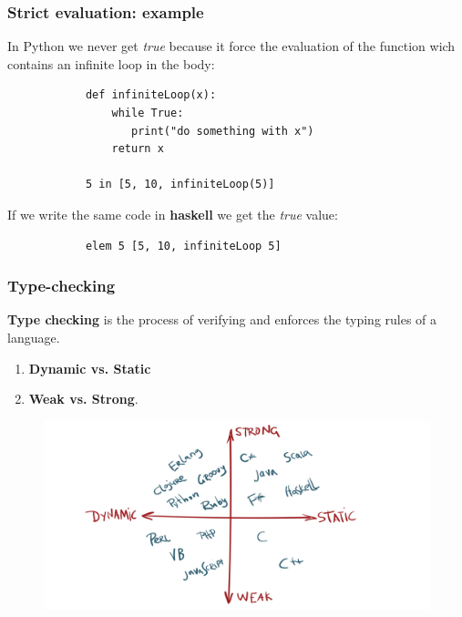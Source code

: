 \documentclass[xcolor ={table,usenames,dvipsnames}]{beamer}
\theoremstyle{definition}
\begin{document}
	\begin{frame}[fragile]
		\frametitle{Strict evaluation: example}
		In Python we never get \textit{true} because  it force the evaluation of the function wich contains an infinite loop in the body:
		\begin{lstlisting}
			def infiniteLoop(x):
			    while True:
		           print("do something with x")
		        return x
				
			5 in [5, 10, infiniteLoop(5)]
		\end{lstlisting}
		If we write the same code in \textbf{haskell} we get the \textit{true} value:
		\begin{lstlisting}
			elem 5 [5, 10, infiniteLoop 5]
		\end{lstlisting}
	\end{frame}

	\begin{frame}
		\frametitle{Type-checking }
			\textbf{Type checking} is the process of verifying and enforces the typing rules of a language.
		\begin{enumerate}
			\item \textbf{Dynamic vs. Static}
			\item \textbf{Weak vs. Strong}.
		\end{enumerate}
		\begin{figure}[h!]
			\centering
			\includegraphics[scale=0.14]{img/classification.png}
		\end{figure}
	\end{frame}
\end{document}
